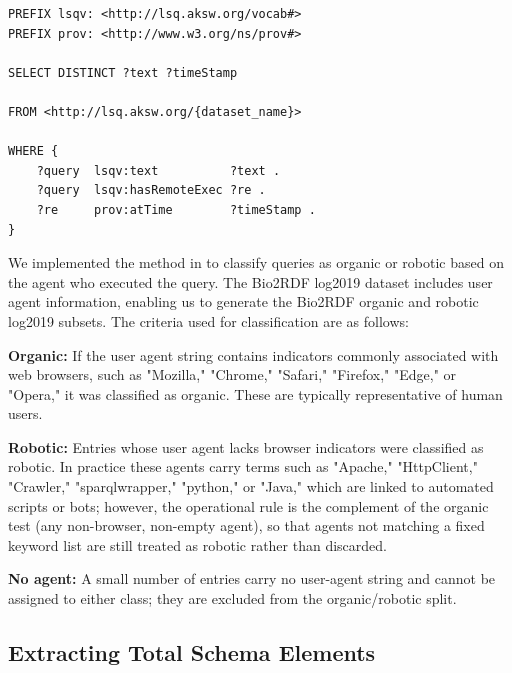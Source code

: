 \documentclass[sw]{iosart2x}
\begin{document}
\begin{center}
\begin{minipage}{0.8\textwidth}  %
\begin{lstlisting}[label={lst:SPARQL_query},linewidth=\linewidth, caption={The templated SPARQL query against the LSQ SPARQL endpoint to retrieve SPARQL queries for selected datasets.}]
PREFIX lsqv: <http://lsq.aksw.org/vocab#>
PREFIX prov: <http://www.w3.org/ns/prov#>

SELECT DISTINCT ?text ?timeStamp

FROM <http://lsq.aksw.org/{dataset_name}>

WHERE {
    ?query  lsqv:text          ?text .
    ?query  lsqv:hasRemoteExec ?re .
    ?re     prov:atTime        ?timeStamp .
}
\end{lstlisting}
\end{minipage}
\end{center}


We implemented the method in \cite{bielefeldt2018practical, malyshev2018getting} to classify queries as organic or robotic based on the agent who executed the query. The Bio2RDF log2019 dataset includes user agent information, enabling us to generate the Bio2RDF organic and robotic log2019 subsets. The criteria used for classification are as follows:

\textbf{Organic:} If the user agent string contains indicators commonly associated with web browsers, such as "Mozilla," "Chrome," "Safari," "Firefox," "Edge," or "Opera," it was classified as organic. These are typically representative of human users.

\textbf{Robotic:} Entries whose user agent lacks browser indicators were classified as robotic. In practice these agents carry terms such as "Apache," "HttpClient," "Crawler," "sparqlwrapper," "python," or "Java," which are linked to automated scripts or bots; however, the operational rule is the complement of the organic test (any non-browser, non-empty agent), so that agents not matching a fixed keyword list are still treated as robotic rather than discarded.

\textbf{No agent:} A small number of entries carry no user-agent string and cannot be assigned to either class; they are excluded from the organic/robotic split.

\subsection{Extracting Total Schema Elements}
\end{document}

